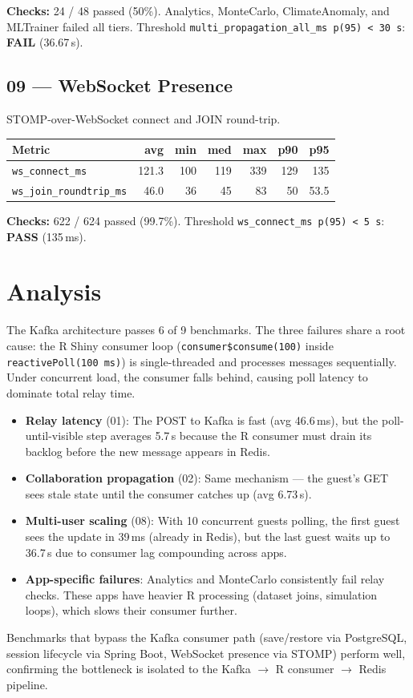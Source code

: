 \documentclass[11pt,a4paper]{article}
\newcommand{\pass}{\textcolor{pass}{\textbf{PASS}}}
\newcommand{\fail}{\textcolor{fail}{\textbf{FAIL}}}
\begin{document}
\medskip
\noindent\textbf{Checks:} 24 / 48 passed (50\%).
Analytics, MonteCarlo, ClimateAnomaly, and MLTrainer failed all tiers.
Threshold \texttt{multi\_propagation\_all\_ms p(95) < 30\,s}: \fail{} (36.67\,s).

\subsection{09 — WebSocket Presence}

STOMP-over-WebSocket connect and JOIN round-trip.

\begin{tabular}{@{}lrrrrrr@{}}
\toprule
\textbf{Metric} & \textbf{avg} & \textbf{min} & \textbf{med} & \textbf{max} & \textbf{p90} & \textbf{p95} \\
\midrule
\texttt{ws\_connect\_ms}        & 121.3 & 100 & 119 & 339 & 129 & 135 \\
\texttt{ws\_join\_roundtrip\_ms} & 46.0  & 36  & 45  & 83  & 50  & 53.5 \\
\bottomrule
\end{tabular}

\medskip
\noindent\textbf{Checks:} 622 / 624 passed (99.7\%).
Threshold \texttt{ws\_connect\_ms p(95) < 5\,s}: \pass{} (135\,ms).

\section{Analysis}

The Kafka architecture passes 6 of 9 benchmarks. The three failures share a root cause:
the R Shiny consumer loop (\texttt{consumer\$consume(100)} inside \texttt{reactivePoll(100\,ms)})
is single-threaded and processes messages sequentially. Under concurrent load, the consumer
falls behind, causing poll latency to dominate total relay time.

\begin{itemize}
  \item \textbf{Relay latency} (01): The POST to Kafka is fast (avg 46.6\,ms), but the
        poll-until-visible step averages 5.7\,s because the R consumer must drain its
        backlog before the new message appears in Redis.
  \item \textbf{Collaboration propagation} (02): Same mechanism — the guest's GET sees
        stale state until the consumer catches up (avg 6.73\,s).
  \item \textbf{Multi-user scaling} (08): With 10 concurrent guests polling, the first
        guest sees the update in 39\,ms (already in Redis), but the last guest waits
        up to 36.7\,s due to consumer lag compounding across apps.
  \item \textbf{App-specific failures}: Analytics and MonteCarlo consistently fail relay
        checks. These apps have heavier R processing (dataset joins, simulation loops),
        which slows their consumer further.
\end{itemize}

Benchmarks that bypass the Kafka consumer path (save/restore via PostgreSQL, session
lifecycle via Spring Boot, WebSocket presence via STOMP) perform well, confirming the
bottleneck is isolated to the Kafka $\to$ R consumer $\to$ Redis pipeline.
\end{document}
